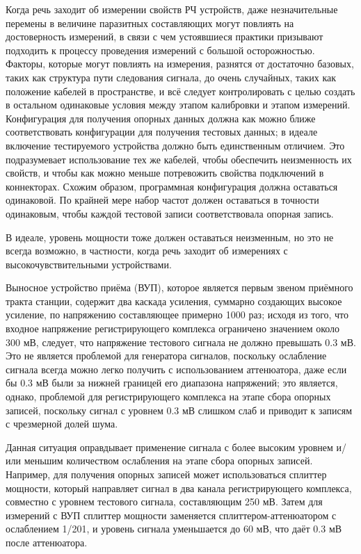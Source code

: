 \documentclass{report}
\begin{document}
Когда речь заходит об измерении свойств РЧ устройств, даже незначительные перемены в величине паразитных составляющих могут повлиять на достоверность измерений, в связи с чем устоявшиеся практики призывают подходить к процессу проведения измерений с большой осторожностью. Факторы, которые могут повлиять на измерения, разнятся от достаточно базовых, таких как структура пути следования сигнала, до очень случайных, таких как положение кабелей в пространстве, и всё следует контролировать с целью создать в остальном одинаковые условия между этапом калибровки и этапом измерений. Конфигурация для получения опорных данных должна как можно ближе соответствовать конфигурации для получения тестовых данных; в идеале включение тестируемого устройства должно быть единственным отличием. Это подразумевает использование тех же кабелей, чтобы обеспечить неизменность их свойств, и чтобы как можно меньше потревожить свойства подключений в коннекторах. Схожим образом, программная конфигурация должна оставаться одинаковой. По крайней мере набор частот должен оставаться в точности одинаковым, чтобы каждой тестовой записи соответствовала опорная запись.

В идеале, уровень мощности тоже должен оставаться неизменным, но это не всегда возможно, в частности, когда речь заходит об измерениях с высокочувствительными устройствами.

Выносное устройство приёма (ВУП), которое является первым звеном приёмного тракта станции, содержит два каскада усиления, суммарно создающих высокое усиление, по напряжению составляющее примерно 1000 раз; исходя из того, что входное напряжение регистрирующего комплекса ограничено значением около 300 мВ, следует, что напряжение тестового сигнала не должно превышать 0.3 мВ. Это не является проблемой для генератора сигналов, поскольку ослабление сигнала всегда можно легко получить с использованием аттенюатора, даже если бы 0.3 мВ были за нижней границей его диапазона напряжений; это является, однако, проблемой для регистрирующего комплекса на этапе сбора опорных записей, поскольку сигнал с уровнем 0.3 мВ слишком слаб и приводит к записям с чрезмерной долей шума.

Данная ситуация оправдывает применение сигнала с более высоким уровнем и/или меньшим количеством ослабления на этапе сбора опорных записей. Например, для получения опорных записей может использоваться сплиттер мощности, который направляет сигнал в два канала регистрирующего комплекса, совместно с уровнем тестового сигнала, составляющим 250 мВ. Затем для измерений с ВУП сплиттер мощности заменяется сплиттером-аттенюатором с ослаблением 1/201, и уровень сигнала уменьшается до 60 мВ, что даёт 0.3 мВ после аттенюатора.
\end{document}
